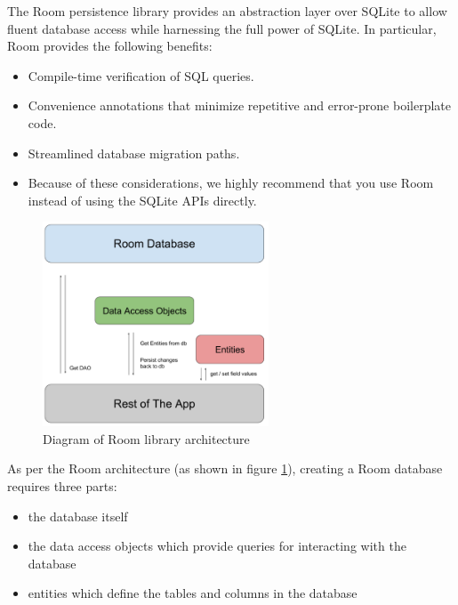 \documentclass[11pt,twoside,a4paper]{report}
\begin{document}
\begin{displayquote}
  The Room persistence library provides an abstraction layer over SQLite to allow fluent database access while harnessing the full power of SQLite. In particular, Room provides the following benefits:

  \begin{itemize}
    \item Compile-time verification of SQL queries.
    \item Convenience annotations that minimize repetitive and error-prone boilerplate code.
    \item Streamlined database migration paths.
    \item Because of these considerations, we highly recommend that you use Room instead of using the SQLite APIs directly.
  \end{itemize}

\end{displayquote}

\begin{figure}[h!]
  \centering
  \includegraphics[width=0.6\textwidth]{roomarchitecture.png}
  \caption{Diagram of Room library architecture \cite{android_room_overview}}
  \label{fig:roomarchitecture}
\end{figure}

As per the Room architecture (as shown in figure \ref{fig:roomarchitecture}), creating a Room database requires three parts:
\begin{itemize}
  \item the database itself
  \item the data access objects which provide queries for interacting with the database
  \item entities which define the tables and columns in the database
\end{itemize}
\end{document}

